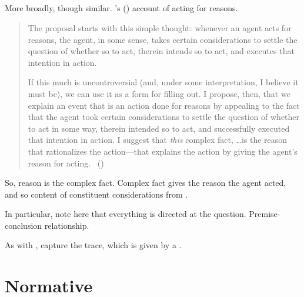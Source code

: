 \subsection{\textcite{Hieronymi:2011aa}}

\begin{note}
  More broadly, though similar.
  \citeauthor{Hieronymi:2011aa}'s (\citeyear{Hieronymi:2011aa}) account of acting for reasons.

  \begin{quote}
    The proposal starts with this simple thought: whenever an agent acts for reasons, the agent, in some sense, takes certain considerations to settle the question of whether so to act, therein intends so to act, and executes that intention in action.

    If this much is uncontroversial (and, under some interpretation, I believe it must be), we can use it as a form for filling out.
    I propose, then, that we explain an event that is an action done for reasons by appealing to the fact that the agent took certain considerations to settle the question of whether to act in some way, therein intended so to act, and successfully executed that intention in action.
    I suggest that \emph{this} complex fact, \dots is the reason that rationalizes the action---that explains the action by giving the agent's reason for acting.\newline
    \mbox{ }\hfill\mbox{(\citeyear[431]{Hieronymi:2011aa})}
  \end{quote}

  So, reason is the complex fact.
  Complex fact gives the reason the agent acted, and so content of constituent considerations from \agpe{}.

  In particular, note here that everything is directed at the question.
  Premise-conclusion relationship.

  As with \citeauthor{Harman:1973ww}, capture the trace, which is given by a \wit{}.
\end{note}

\section{Normative}

\subsection{\textcite{Lord:2018aa}}

